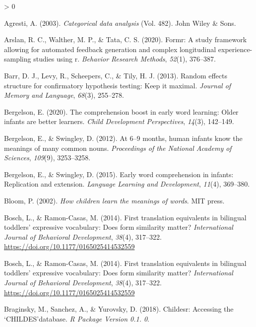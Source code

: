 \documentclass[
  english,
  man,man,floatsintext]{apa6}
\newlength{\cslhangindent}
\newenvironment{CSLReferences}[2] %
 {%
  \setlength{\parindent}{0pt}
  \ifodd #1 \everypar{\setlength{\hangindent}{\cslhangindent}}\ignorespaces\fi
  \ifnum #2 > 0
  \setlength{\parskip}{#2\baselineskip}
  \fi
 }%
 {}
\begin{document}
\hypertarget{refs}{}
\begin{CSLReferences}{1}{0}
\leavevmode\hypertarget{ref-agresti2003categorical}{}%
Agresti, A. (2003). \emph{Categorical data analysis} (Vol. 482). John Wiley \& Sons.

\leavevmode\hypertarget{ref-arslan2020formr}{}%
Arslan, R. C., Walther, M. P., \& Tata, C. S. (2020). Formr: A study framework allowing for automated feedback generation and complex longitudinal experience-sampling studies using r. \emph{Behavior Research Methods}, \emph{52}(1), 376--387.

\leavevmode\hypertarget{ref-barr2013random}{}%
Barr, D. J., Levy, R., Scheepers, C., \& Tily, H. J. (2013). Random effects structure for confirmatory hypothesis testing: Keep it maximal. \emph{Journal of Memory and Language}, \emph{68}(3), 255--278.

\leavevmode\hypertarget{ref-bergelson2020comprehension}{}%
Bergelson, E. (2020). The comprehension boost in early word learning: Older infants are better learners. \emph{Child Development Perspectives}, \emph{14}(3), 142--149.

\leavevmode\hypertarget{ref-bergelson2012months}{}%
Bergelson, E., \& Swingley, D. (2012). At 6--9 months, human infants know the meanings of many common nouns. \emph{Proceedings of the National Academy of Sciences}, \emph{109}(9), 3253--3258.

\leavevmode\hypertarget{ref-bergelson2015early}{}%
Bergelson, E., \& Swingley, D. (2015). Early word comprehension in infants: Replication and extension. \emph{Language Learning and Development}, \emph{11}(4), 369--380.

\leavevmode\hypertarget{ref-bloom2002children}{}%
Bloom, P. (2002). \emph{How children learn the meanings of words}. MIT press.

\leavevmode\hypertarget{ref-bosch2014first}{}%
Bosch, L., \& Ramon-Casas, M. (2014). First translation equivalents in bilingual toddlers' expressive vocabulary: {Does} form similarity matter? \emph{International Journal of Behavioral Development}, \emph{38}(4), 317--322. \url{https://doi.org/10.1177/0165025414532559}

\leavevmode\hypertarget{ref-bosch2014first}{}%
Bosch, L., \& Ramon-Casas, M. (2014). First translation equivalents in bilingual toddlers' expressive vocabulary: {Does} form similarity matter? \emph{International Journal of Behavioral Development}, \emph{38}(4), 317--322. \url{https://doi.org/10.1177/0165025414532559}

\leavevmode\hypertarget{ref-braginsky2018childesr}{}%
Braginsky, M., Sanchez, A., \& Yurovsky, D. (2018). Childesr: Accessing the `CHILDES'database. \emph{R Package Version 0.1. 0}.


\end{CSLReferences}
\end{document}
